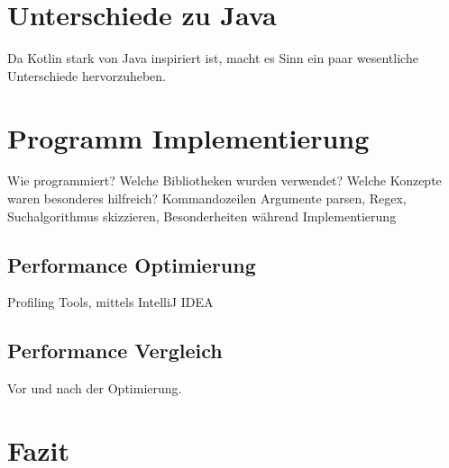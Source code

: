 \documentclass{article}
\begin{document}
\section{Unterschiede zu Java}
Da Kotlin stark von Java inspiriert ist, macht es Sinn ein paar wesentliche Unterschiede hervorzuheben.

\section{Programm Implementierung}
Wie programmiert? Welche Bibliotheken wurden verwendet? Welche Konzepte waren besonderes hilfreich? Kommandozeilen Argumente parsen, Regex, Suchalgorithmus skizzieren, Besonderheiten während Implementierung
\subsection{Performance Optimierung}
Profiling Tools, mittels IntelliJ IDEA
\subsection{Performance Vergleich}
Vor und nach der Optimierung.

\section{Fazit}




\end{document}
